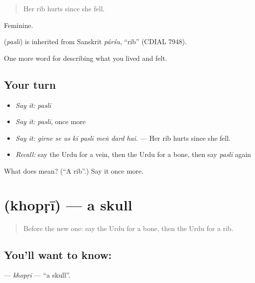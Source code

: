 \begin{quote}
Her rib hurts since she fell.
\end{quote}

Feminine.

\begin{cousinweb}
\textbf{} (\emph{paslī}) is inherited from Sanskrit \emph{párśu}, \textquotedblleft{}rib\textquotedblright{} (CDIAL 7948).
\end{cousinweb}

\begin{grammarlens}[title={What you've built}]
One more word for describing what you lived and felt.
\end{grammarlens}

\subsection*{Your turn}
\begin{itemize}
\raggedright
  \item \emph{Say it:} \emph{paslī}
  \item \emph{Say it:} \emph{paslī}, once more
  \item \emph{Say it:} \emph{girne se us kī paslī meṅ dard hai.} — Her rib hurts since she fell.
  \item \emph{Recall:} say the Urdu for a vein, then the Urdu for a bone, then say \emph{paslī} again
\end{itemize}

\begin{tcolorbox}[breakable,colback=teal!4,colframe=teal!35!black,title={Before you move on}]
What does  mean? (\textquotedblleft{}A rib\textquotedblright{}.) Say it once more.
\end{tcolorbox}
\section[\texorpdfstring{\ur{کھوپڑی} (khopṛī)}{کھوپڑی (khopṛī)}]{ (khopṛī) — a skull}

\label{lesson:UR-C465-khopri}



\begin{quote}
Before the new one: say the Urdu for a bone, then the Urdu for a rib.
\end{quote}

\subsection*{You'll want to know: }
\textbf{} — \emph{khopṛī} — \textquotedblleft{}a skull\textquotedblright{}.

